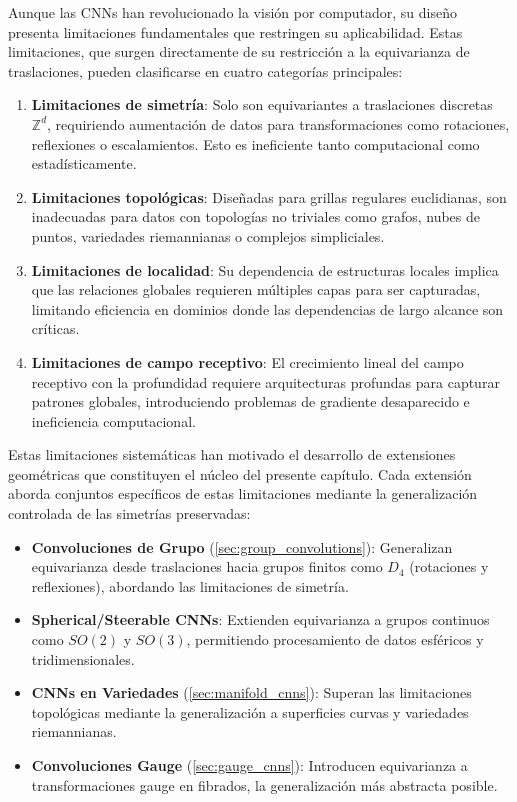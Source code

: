 Aunque las \glspl{CNN} han revolucionado la visión por computador, su diseño presenta limitaciones fundamentales que restringen su aplicabilidad. Estas limitaciones, que surgen directamente de su restricción a la equivarianza de traslaciones, pueden clasificarse en cuatro categorías principales:

\begin{enumerate}
    \item \textbf{Limitaciones de simetría}: Solo son equivariantes a traslaciones discretas $\mathbb{Z}^d$, requiriendo aumentación de datos para transformaciones como rotaciones, reflexiones o escalamientos. Esto es ineficiente tanto computacional como estadísticamente.
    
    \item \textbf{Limitaciones topológicas}: Diseñadas para grillas regulares euclidianas, son inadecuadas para datos con topologías no triviales como grafos, nubes de puntos, variedades riemannianas o complejos simpliciales.
    
    \item \textbf{Limitaciones de localidad}: Su dependencia de estructuras locales implica que las relaciones globales requieren múltiples capas para ser capturadas, limitando eficiencia en dominios donde las dependencias de largo alcance son críticas.
    
    \item \textbf{Limitaciones de campo receptivo}: El crecimiento lineal del campo receptivo con la profundidad requiere arquitecturas profundas para capturar patrones globales, introduciendo problemas de gradiente desaparecido e ineficiencia computacional.
\end{enumerate}

Estas limitaciones sistemáticas han motivado el desarrollo de extensiones geométricas que constituyen el núcleo del presente capítulo. Cada extensión aborda conjuntos específicos de estas limitaciones mediante la generalización controlada de las simetrías preservadas:

\begin{itemize}
    \item \textbf{Convoluciones de Grupo} (\autoref{sec:group_convolutions}): Generalizan equivarianza desde traslaciones hacia grupos finitos como $D_4$ (rotaciones y reflexiones), abordando las limitaciones de simetría.
    \item \textbf{Spherical/Steerable \glspl{CNN}}: Extienden equivarianza a grupos continuos como $SO(2)$ y $SO(3)$, permitiendo procesamiento de datos esféricos y tridimensionales.
    \item \textbf{\glspl{CNN} en Variedades} (\autoref{sec:manifold_cnns}): Superan las limitaciones topológicas mediante la generalización a superficies curvas y variedades riemannianas.
    \item \textbf{Convoluciones Gauge} (\autoref{sec:gauge_cnns}): Introducen equivarianza a transformaciones gauge en fibrados, la generalización más abstracta posible.
\end{itemize}

